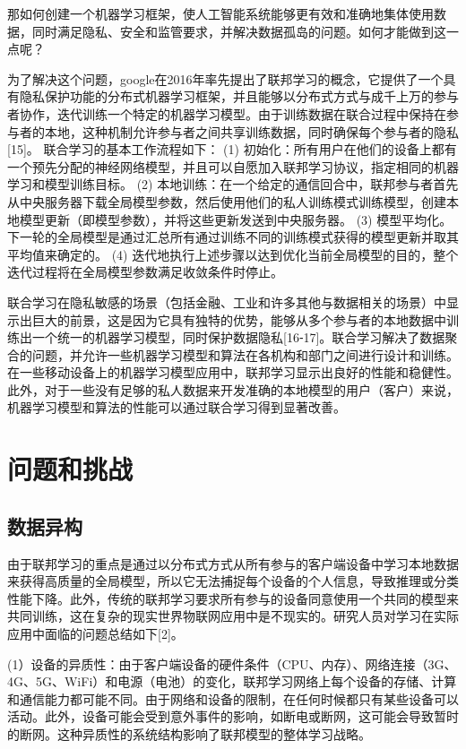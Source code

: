 那如何创建一个机器学习框架，使人工智能系统能够更有效和准确地集体使用数据，同时满足隐私、安全和监管要求，并解决数据孤岛的问题。如何才能做到这一点呢？

为了解决这个问题，google在2016年率先提出了联邦学习的概念，它提供了一个具有隐私保护功能的分布式机器学习框架，并且能够以分布式方式与成千上万的参与者协作，迭代训练一个特定的机器学习模型。由于训练数据在联合过程中保持在参与者的本地，这种机制允许参与者之间共享训练数据，同时确保每个参与者的隐私[15]。
联合学习的基本工作流程如下：
(1) 初始化：所有用户在他们的设备上都有一个预先分配的神经网络模型，并且可以自愿加入联邦学习协议，指定相同的机器学习和模型训练目标。
(2) 本地训练：在一个给定的通信回合中，联邦参与者首先从中央服务器下载全局模型参数，然后使用他们的私人训练模式训练模型，创建本地模型更新（即模型参数），并将这些更新发送到中央服务器。
(3) 模型平均化。下一轮的全局模型是通过汇总所有通过训练不同的训练模式获得的模型更新并取其平均值来确定的。
(4) 迭代地执行上述步骤以达到优化当前全局模型的目的，整个迭代过程将在全局模型参数满足收敛条件时停止。

联合学习在隐私敏感的场景（包括金融、工业和许多其他与数据相关的场景）中显示出巨大的前景，这是因为它具有独特的优势，能够从多个参与者的本地数据中训练出一个统一的机器学习模型，同时保护数据隐私[16⁃17]。联合学习解决了数据聚合的问题，并允许一些机器学习模型和算法在各机构和部门之间进行设计和训练。在一些移动设备上的机器学习模型应用中，联邦学习显示出良好的性能和稳健性。此外，对于一些没有足够的私人数据来开发准确的本地模型的用户（客户）来说，机器学习模型和算法的性能可以通过联合学习得到显著改善。

\section {问题和挑战}

\subsection{数据异构}
由于联邦学习的重点是通过以分布式方式从所有参与的客户端设备中学习本地数据来获得高质量的全局模型，所以它无法捕捉每个设备的个人信息，导致推理或分类性能下降。此外，传统的联邦学习要求所有参与的设备同意使用一个共同的模型来共同训练，这在复杂的现实世界物联网应用中是不现实的。研究人员对学习在实际应用中面临的问题总结如下[2]。

(1）设备的异质性：由于客户端设备的硬件条件（CPU、内存）、网络连接（3G、4G、5G、WiFi）和电源（电池）的变化，联邦学习网络上每个设备的存储、计算和通信能力都可能不同。由于网络和设备的限制，在任何时候都只有某些设备可以活动。此外，设备可能会受到意外事件的影响，如断电或断网，这可能会导致暂时的断网。这种异质性的系统结构影响了联邦模型的整体学习战略。

